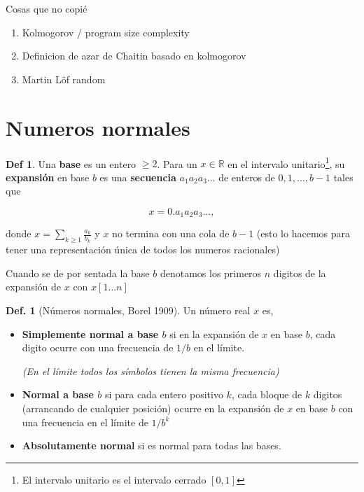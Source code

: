 \documentclass{report}
\theoremstyle{definition} %
\newtheorem{definition}{Def.}
\newtheorem*{definition*}{Def}
\begin{document}
Cosas que no copié

\begin{enumerate}
    \item Kolmogorov / program size complexity
    \item Definicion de azar de Chaitin basado en kolmogorov
    \item Martin Löf random
\end{enumerate}

\section{Numeros normales}

\begin{definition*}
    Una \textbf{base} es un entero $\geq 2$. Para un $x \in \mathbb{R}$ en el
    intervalo unitario\footnote{El intervalo unitario es el intervalo cerrado
    $[0, 1]$}, su \textbf{expansión} en base $b$ es una \textbf{secuencia} $a_1
    a_2 a_3 \dots$ de enteros de ${0, 1, \dots, b-1}$ tales que

    $$x = 0.a_1 a_2 a_3 \dots,$$

    donde $x = \sum_{k \geq 1} \frac{a_k}{b_k}$ y $x$ no termina con una cola de
    $b - 1$ (esto lo hacemos para tener una representación única de todos los
    numeros racionales)

    Cuando se de por sentada la base $b$ denotamos los primeros $n$ digitos de
    la expansión de $x$ con $x[1\dots n]$
\end{definition*}


\begin{definition}[Números normales, Borel 1909]\label{def:normal-borel}
    Un número real $x$ es,
    \begin{itemize}
        \item \textbf{Simplemente normal a base $b$} si en la expansión de $x$
        en base $b$, cada digito ocurre con una frecuencia de $1/b$ en el
        límite.

        \textit{(En el límite todos los símbolos tienen la misma frecuencia)}
        \item \textbf{Normal a base $b$} si para cada entero positivo $k$, cada
        bloque de $k$ digitos (arrancando de cualquier posición) ocurre en la
        expansión de $x$ en base $b$ con una frecuencia en el límite de $1/b^k$
        \item \textbf{Absolutamente normal} si es normal para todas las bases.
    \end{itemize}
\end{definition}
\end{document}
